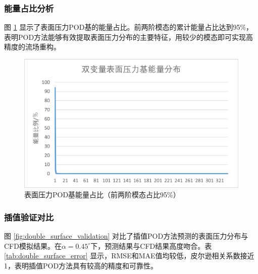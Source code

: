 \subsubsection{能量占比分析}

图 \ref{fig:double_surface_energy} 显示了表面压力POD基的能量占比。前两阶模态的累计能量占比达到95\%，表明POD方法能够有效提取表面压力分布的主要特征，用较少的模态即可实现高精度的流场重构。

\begin{figure}[H]
    \centering
    \includegraphics[width=0.8\linewidth]{image/基能量分布/双变量表面压力基能量分布.png}
    \caption{\songti 表面压力POD基能量占比（前两阶模态占比95\%）}
    \label{fig:double_surface_energy}
\end{figure}

\subsubsection{插值验证对比}

图 \ref{fig:double_surface_validation} 对比了插值POD方法预测的表面压力分布与CFD模拟结果。在$\alpha=0.45^\circ$下，预测结果与CFD结果高度吻合。表 \ref{tab:double_surface_error} 显示，RMSE和MAE值均较低，皮尔逊相关系数接近1，表明插值POD方法具有较高的精度和可靠性。

